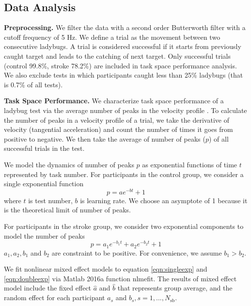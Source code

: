 \subsection{Data Analysis}

\textbf{Preprocessing.}
We filter the data with a second order Butterworth filter with a cutoff frequency of 5 Hz.
We define a trial as the movement between two consecutive ladybugs.
A trial is considered successful if it starts from previously caught target and leads to the catching of next target. 
Only successful trials (control 99.8\%, stroke 78.2\%) are included in task space performance analysis.
We also exclude tests in which participants caught less than 25\% ladybugs (that is 0.7\% of all tests).

\textbf{Task Space Performance.}
We characterize task space performance of a ladybug test via the average number of peaks in the velocity profile \cite{}. 
To calculate the number of peaks in a velocity profile of a trial, we take the derivative of velocity (tangential acceleration) and count the number of times it goes from positive to negative.
We then take the average of number of peaks ($ p $) of all successful trials in the test.

We model the dynamics of number of peaks $ p $ as exponential functions of time $ t $ represented by task number.
For participants in the control group, we consider a single exponential function
\begin{equation}\label{eqn:singleexp}
p = a e^{-b t} + 1
\end{equation}
where $ t $ is test number, $ b $ is learning rate.
We choose an asymptote of 1 because it is the theoretical limit of number of peaks.

For participants in the stroke group, we consider two exponential components to model the number of peaks
\begin{equation}\label{eqn:doubleexp}
p = a_1 e^{-b_1 t} + a_2 e^{-b_2 t} + 1
\end{equation}
$ a_1, a_2, b_1 $ and $ b_2 $ are constraint to be positive.
For convenience, we assume $ b_1 > b_2 $.

We fit nonlinear mixed effect models \cite{} to equation \ref{eqn:singleexp} and \ref{eqn:doubleexp} via Matlab 2016a function \textsf{nlmefit}.
The results of mixed effect model include the fixed effect $ \hat{a} $ and $ \hat{b} $ that represents group average, and the random effect for each participant $ a_s $ and $ b_s, s = 1, ..., N_\text{sb} $.

